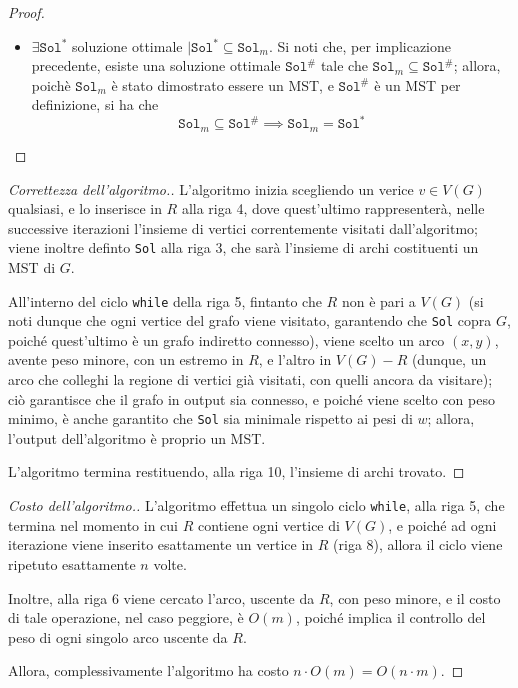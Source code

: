 \documentclass[a4paper, 12pt]{report}
\begin{document}
\begin{proof}
\begin{itemize}
            \item[]  $\exists \texttt{Sol}^*$ soluzione ottimale $\mid \texttt{Sol}^* \subseteq \texttt{Sol}_m$. Si noti che, per implicazione precedente, esiste una soluzione ottimale $\texttt{Sol}^\#$ tale che $\texttt{Sol}_m \subseteq \texttt{Sol}^\#$; allora, poichè $\texttt{Sol}_m$ è stato dimostrato essere un MST, e $\texttt{Sol}^\#$ è un MST per definizione, si ha che $$\texttt{Sol}_m \subseteq \texttt{Sol}^\# \implies \texttt{Sol}_m = \texttt{Sol}^*$$
        \end{itemize}
    \end{proof}

    \begin{proof}[Correttezza dell'algoritmo.]
        L'algoritmo inizia scegliendo un verice $v \in V(G)$ qualsiasi, e lo inserisce in $R$ alla riga 4, dove quest'ultimo rappresenterà, nelle successive iterazioni l'insieme di vertici correntemente visitati dall'algoritmo; viene inoltre definto \texttt{Sol} alla riga 3, che sarà l'insieme di archi costituenti un MST di $G$.

        All'interno del ciclo \texttt{while} della riga 5, fintanto che $R$ non è pari a $V(G)$ (si noti dunque che ogni vertice del grafo viene visitato, garantendo che \texttt{Sol} copra $G$, poiché quest'ultimo è un grafo indiretto connesso), viene scelto un arco $(x, y)$, avente peso minore, con un estremo in $R$, e l'altro in $V(G) - R$ (dunque, un arco che colleghi la regione di vertici già visitati, con quelli ancora da visitare); ciò garantisce che il grafo in output sia connesso, e poiché viene scelto con peso minimo, è anche garantito che \texttt{Sol} sia minimale rispetto ai pesi di $w$; allora, l'output dell'algoritmo è proprio un MST.

        L'algoritmo termina restituendo, alla riga 10, l'insieme di archi trovato.
    \end{proof}

    \begin{proof}[Costo dell'algoritmo.]
        L'algoritmo effettua un singolo ciclo \texttt{while}, alla riga 5, che termina nel momento in cui $R$ contiene ogni vertice di $V(G)$, e poiché ad ogni iterazione viene inserito esattamente un vertice in $R$ (riga 8), allora il ciclo viene ripetuto esattamente $n$ volte.

        Inoltre, alla riga 6 viene cercato l'arco, uscente da $R$, con peso minore, e il costo di tale operazione, nel caso peggiore, è $O(m)$, poiché implica il controllo del peso di ogni singolo arco uscente da $R$.

        Allora, complessivamente l'algoritmo ha costo $n \cdot O(m) = O(n \cdot m)$.
    \end{proof}
\end{document}
